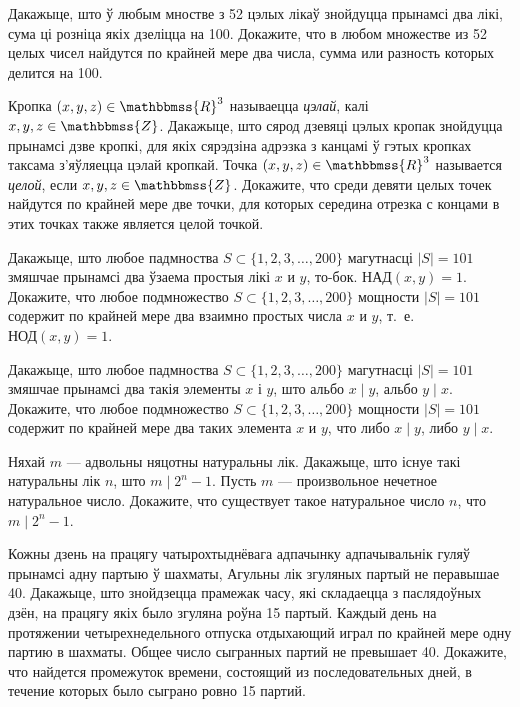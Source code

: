 




\begin{problemList}
	
\problemItemSimple
{Дакажыце, што ў любым мностве з 52 цэлых лікаў знойдуцца прынамсі два лікі, сума ці розніца якіх дзеліцца на 100.}
{Докажите, что в любом множестве из 52 целых чисел найдутся по крайней мере два числа, сумма или разность которых делится на 100.}

\bigskip

\problemItemSimple
{Кропка $(x, y, z) \in \mathbbmss{R}^3$ называецца \emph{цэлай}, калі $x, y, z \in \mathbbmss{Z}$. Дакажыце, што сярод дзевяці цэлых кропак знойдуцца прынамсі дзве кропкі, для якіх сярэдзіна адрэзка з канцамі ў гэтых кропках таксама з'яўляецца цэлай кропкай.}
{Точка $(x, y, z) \in \mathbbmss{R}^3$ называется \emph{целой}, если $x, y, z \in \mathbbmss{Z}$. Докажите, что среди девяти целых точек найдутся по крайней мере две точки, для которых середина отрезка с концами в этих точках также является целой точкой.}

\bigskip

\problemItemSimple
{Дакажыце, што любое падмноства $S \subset \{1, 2, 3, \ldots, 200\}$ магутнасці $|S| = 101$ змяшчае прынамсі два ўзаема простыя лікі $x$ и $y$, то-бок. $\text{НАД}(x, y) = 1$.}
{Докажите, что любое подмножество $S \subset \{1, 2, 3, \ldots, 200\}$ мощности $|S| = 101$ содержит по крайней мере два взаимно простых числа $x$ и $y$, т.~е. $\text{НОД}(x, y) = 1$.}

\bigskip

\problemItemSimple
{Дакажыце, што любое падмноства $S \subset \{1, 2, 3, \ldots, 200\}$ магутнасці $|S| = 101$ змяшчае прынамсі два такія элементы $x$ і $y$, што альбо $x \mid y$, альбо $y \mid x$.}
{Докажите, что любое подмножество $S \subset \{1, 2, 3, \ldots, 200\}$ мощности $|S| = 101$ содержит по крайней мере два таких элемента $x$ и $y$, что либо $x \mid y$, либо $y \mid x$.}

\bigskip

\problemItemSimple
{Няхай $m$ --- адвольны няцотны натуральны лік. Дакажыце, што існуе такі натуральны лік $n$, што $m \mid 2^n - 1$.}
{Пусть $m$ --- произвольное нечетное натуральное число. Докажите, что существует такое натуральное число $n$, что $m \mid 2^n - 1$.}

\problemItemSimple
{Кожны дзень на працягу чатырохтыднёвага адпачынку адпачывальнік гуляў прынамсі адну партыю ў шахматы, Агульны лік згуляных партый не перавышае 40. Дакажыце, што знойдзецца прамежак часу, які складаецца з паслядоўных дзён, на працягу якіх было згуляна роўна 15 партый.}
{Каждый день на протяжении четырехнедельного отпуска отдыхающий играл
по крайней мере одну партию в шахматы. Общее число сыгранных партий не
превышает 40. Докажите, что найдется промежуток времени, состоящий из
последовательных дней, в течение которых было сыграно ровно 15 партий.}
	
\end{problemList}

